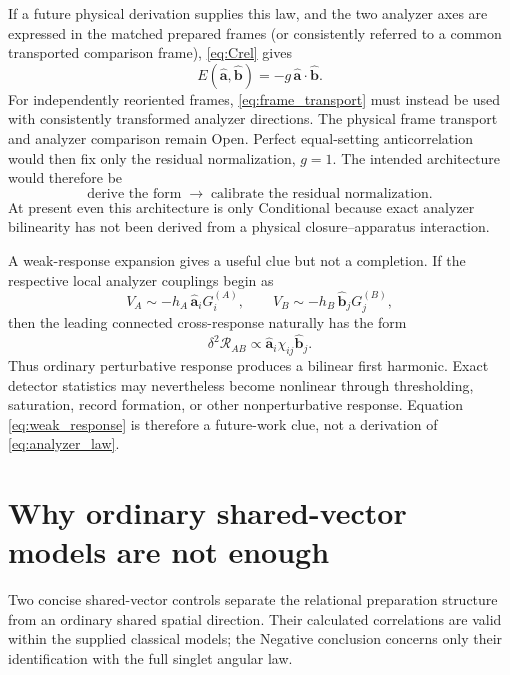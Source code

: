 \documentclass[11pt]{article}
\theoremstyle{remark}
\newcommand{\ahat}{\hat{\bm a}}
\newcommand{\bhat}{\hat{\bm b}}
\begin{document}
If a future physical derivation supplies this law, and the two analyzer axes
are expressed in the matched prepared frames (or consistently referred to a
common transported comparison frame), \eqref{eq:Crel} gives
\begin{equation}
  E(\ahat,\bhat)=-g\,\ahat\cdot\bhat.
  \label{eq:dot_up_to_g}
\end{equation}
For independently reoriented frames, \eqref{eq:frame_transport} must
instead be used with consistently transformed analyzer directions.
The physical frame transport and analyzer comparison remain Open.
Perfect equal-setting anticorrelation would then fix only the residual normalization, \(g=1\).  The
intended architecture would therefore be
\begin{equation}
  \boxed{\text{derive the form}\;\longrightarrow\;\text{calibrate the residual normalization}.}
  \label{eq:form_then_norm}
\end{equation}
At present even this architecture is only Conditional because exact analyzer bilinearity has not
been derived from a physical closure--apparatus interaction.

A weak-response expansion gives a useful clue but not a completion.  If the
respective local analyzer couplings begin as
\begin{equation}
  V_A\sim-h_A\,\ahat_iG_i^{(A)},
  \qquad
  V_B\sim-h_B\,\bhat_jG_j^{(B)},
  \label{eq:local_weak_analyzer_couplings}
\end{equation}
then the leading connected cross-response naturally has the form
\begin{equation}
  \delta^2\mathcal R_{AB}
  \propto
  \ahat_i\chi_{ij}\bhat_j.
  \label{eq:weak_response}
\end{equation}
Thus ordinary perturbative response produces a bilinear first harmonic.  Exact detector statistics
may nevertheless become nonlinear through thresholding, saturation, record formation, or other
nonperturbative response.  Equation \eqref{eq:weak_response} is therefore a future-work clue, not a
derivation of \eqref{eq:analyzer_law}.

\section{Why ordinary shared-vector models are not enough}
\label{sec:shared_vector}

Two concise shared-vector controls separate the relational preparation structure
from an ordinary shared spatial direction.  Their calculated correlations are
valid within the supplied classical models; the Negative conclusion concerns
only their identification with the full singlet angular law.
\end{document}
